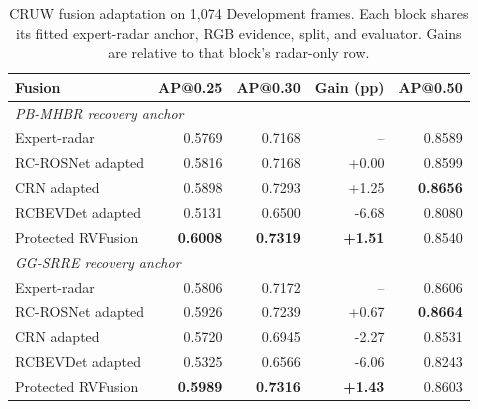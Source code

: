 \begin{table}[t]
\centering\small
\caption{CRUW fusion adaptation on 1,074 Development frames. Each block shares its fitted expert-radar anchor, RGB evidence, split, and evaluator. Gains are relative to that block's radar-only row.}
\label{tab:cruw-combined}
\begin{tabular*}{\textwidth}{@{\extracolsep{\fill}}lrrrr@{}}
\toprule
Fusion & AP@0.25 & AP@0.30 & Gain (pp) & AP@0.50\\
\midrule
\multicolumn{5}{l}{\emph{PB-MHBR recovery anchor}}\\
Expert-radar &0.5769&0.7168&--&0.8589\\
RC-ROSNet adapted &0.5816&0.7168&+0.00&0.8599\\
CRN adapted &0.5898&0.7293&+1.25&\textbf{0.8656}\\
RCBEVDet adapted &0.5131&0.6500&-6.68&0.8080\\
Protected RVFusion &\textbf{0.6008}&\textbf{0.7319}&\textbf{+1.51}&0.8540\\
\midrule
\multicolumn{5}{l}{\emph{GG-SRRE recovery anchor}}\\
Expert-radar &0.5806&0.7172&--&0.8606\\
RC-ROSNet adapted &0.5926&0.7239&+0.67&\textbf{0.8664}\\
CRN adapted &0.5720&0.6945&-2.27&0.8531\\
RCBEVDet adapted &0.5325&0.6566&-6.06&0.8243\\
Protected RVFusion &\textbf{0.5989}&\textbf{0.7316}&\textbf{+1.43}&0.8603\\
\bottomrule
\end{tabular*}
\end{table}
